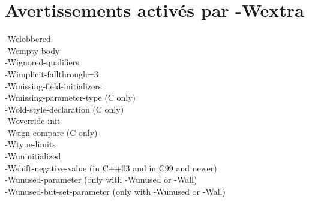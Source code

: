 \documentclass[headings=appendixprefix]{scrreprt}
\begin{document}
\newpage

\section{Avertissements activés par -Wextra}

-Wclobbered\\
-Wempty-body\\
-Wignored-qualifiers\\
-Wimplicit-fallthrough=3\\
-Wmissing-field-initializers\\
-Wmissing-parameter-type (C only)\\
-Wold-style-declaration (C only)\\
-Woverride-init\\
-Wsign-compare (C only)\\
-Wtype-limits\\
-Wuninitialized\\
-Wshift-negative-value (in C++03 and in C99 and newer)\\
-Wunused-parameter (only with -Wunused or -Wall)\\
-Wunused-but-set-parameter (only with -Wunused or -Wall)\\
\end{document}

